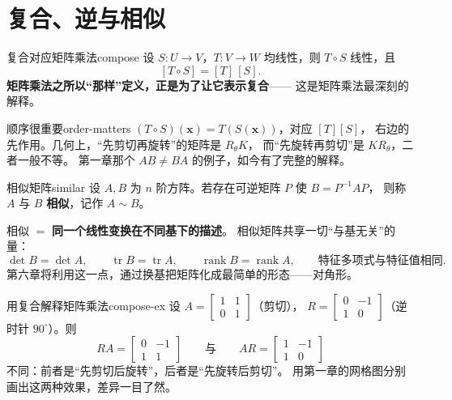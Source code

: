 \documentclass[11pt,a4paper,openany]{ctexbook}
\DeclareMathOperator{\rank}{rank}
\DeclareMathOperator{\tr}{tr}
\begin{document}
\section{复合、逆与相似}

\begin{prop}{复合对应矩阵乘法}{compose}
设 $S:U\to V$，$T:V\to W$ 均线性，则 $T\circ S$ 线性，且
\[
[T\circ S]=[T]\,[S].
\]
\textbf{矩阵乘法之所以“那样”定义，正是为了让它表示复合}——
这是矩阵乘法最深刻的解释。
\end{prop}

\begin{remk}{顺序很重要}{order-matters}
$(T\circ S)(\boldsymbol{x})=T(S(\boldsymbol{x}))$，对应 $[T][S]$，
右边的先作用。几何上，“先剪切再旋转”的矩阵是 $R_\theta K$，
而“先旋转再剪切”是 $KR_\theta$，二者一般不等。
第一章那个 $AB\neq BA$ 的例子，如今有了完整的解释。
\end{remk}

\begin{defn}{相似矩阵}{similar}
设 $A,B$ 为 $n$ 阶方阵。若存在可逆矩阵 $P$ 使 $B=P^{-1}AP$，
则称 $A$ 与 $B$ \textbf{相似}，记作 $A\sim B$。
\end{defn}

\begin{keypoint}
相似 $=$ \textbf{同一个线性变换在不同基下的描述}。
相似矩阵共享一切“与基无关”的量：
\[
\det B=\det A,\qquad \tr B=\tr A,\qquad
\rank B=\rank A,\qquad
\text{特征多项式与特征值相同}.
\]
第六章将利用这一点，通过换基把矩阵化成最简单的形态——对角形。
\end{keypoint}

\begin{exmp}{用复合解释矩阵乘法}{compose-ex}
设 $A=\begin{bmatrix}1&1\\0&1\end{bmatrix}$（剪切），
$R=\begin{bmatrix}0&-1\\1&0\end{bmatrix}$（逆时针 $90^\circ$）。则
\[
RA=\begin{bmatrix}0&-1\\1&1\end{bmatrix}
\qquad\text{与}\qquad
AR=\begin{bmatrix}1&-1\\1&0\end{bmatrix}
\]
不同：前者是“先剪切后旋转”，后者是“先旋转后剪切”。
用第一章的网格图分别画出这两种效果，差异一目了然。
\end{exmp}
\end{document}
